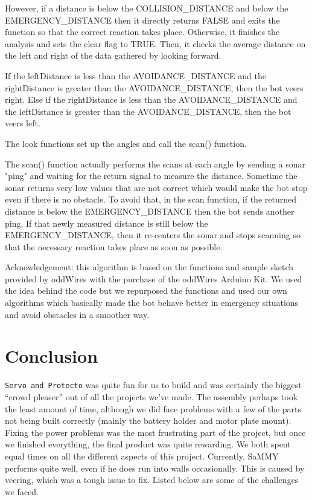 \documentclass[11pt]{article}
\begin{document}
However, if a distance is below the COLLISION\_DISTANCE and below the EMERGENCY\_DISTANCE then it directly returns FALSE and exits the function so that the correct reaction takes place. Otherwise, it finishes the analysis and sets the clear flag to TRUE. Then, it checks the average distance on the left and right of the data gathered by looking forward.

If the leftDistance is less than the AVOIDANCE\_DISTANCE and the rightDistance is greater than the AVOIDANCE\_DISTANCE, then the bot veers right.
Else if the rightDistance is less than the AVOIDANCE\_DISTANCE and the leftDistance is greater than the AVOIDANCE\_DISTANCE, then the bot veers left.

The look functions set up the angles and call the scan() function.
 
The scan() function actually performs the scans at each angle by sending a sonar "ping" and waiting for the return signal to measure the distance. Sometime the sonar returns very low values that are not correct which would make the bot stop even if there is no obstacle. To avoid that, in the scan function, if the returned distance is below the EMERGENCY\_DISTANCE then the bot sends another ping. If that newly measured distance is still below the EMERGENCY\_DISTANCE, then it re-centers the sonar and stops scanning so that the necessary reaction takes place as soon as possible.

Acknowledgement: this algorithm is based on the functions and sample sketch provided by oddWires with the purchase of the oddWires Arduino Kit.
                 We used the idea behind the code but we repurposed the functions and used our own algorithms which basically made the bot behave 
                 better in emergency situations and avoid obstacles in a smoother way. 




\section{Conclusion}
\texttt{Servo and Protecto} was quite fun for us to build and was certainly the biggest ``crowd pleaser'' out of all the projects we've made.  The assembly perhaps took the least amount of time, although we did face problems with a few of the parts not being built correctly (mainly the battery holder and motor plate mount).  Fixing the power problems was the most frustrating part of the project, but once we finished everything, the final product was quite rewarding.  We both spent equal times on all the different aspects of this project.  Currently, SaMMY performs quite well, even if he does run into walls occasionally.  This is caused by veering, which was a tough issue to fix. Listed below are some of the challenges we faced.
	
\end{document}
